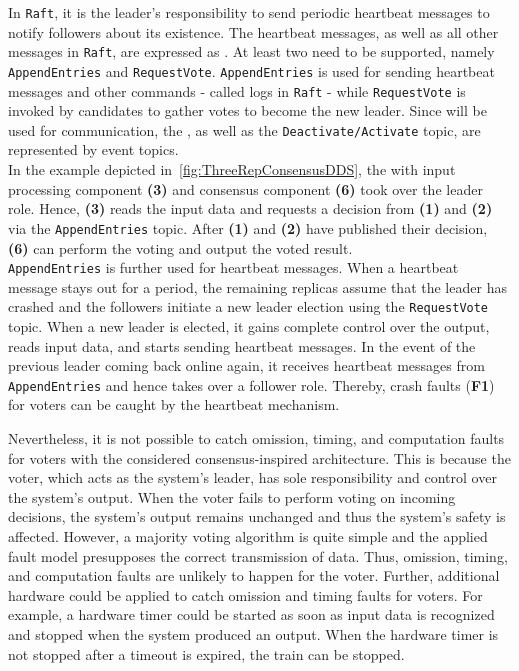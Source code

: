 \noindent
In \texttt{Raft}, it is the leader's responsibility to send periodic heartbeat messages to notify followers about its existence.
The heartbeat messages, as well as all other messages in \texttt{Raft}, are expressed as .
At least two  need to be supported, namely \texttt{AppendEntries} and \texttt{RequestVote}.
\texttt{AppendEntries} is used for sending heartbeat messages and other commands - called logs in \texttt{Raft} - while \texttt{RequestVote} is invoked by candidates to gather votes to become the new leader.
Since  will be used for communication, the , as well as the \texttt{Deactivate/Activate} topic, are represented by  event topics.
\\

\noindent
In the example depicted in~\autoref{fig:ThreeRepConsensusDDS}, the  with input processing component \textbf{(3)} and consensus component \textbf{(6)} took over the leader role.
Hence, \textbf{(3)} reads the input data and requests a decision from \textbf{(1)} and \textbf{(2)} via the \texttt{AppendEntries} topic.
After \textbf{(1)} and \textbf{(2)} have published their decision, \textbf{(6)} can perform the voting and output the voted result.
\\

\noindent
\texttt{AppendEntries} is further used for heartbeat messages.
When a heartbeat message stays out for a period, the remaining replicas assume that the leader has crashed and the followers initiate a new leader election using the \texttt{RequestVote} topic.
When a new leader is elected, it gains complete control over the output, reads input data, and starts sending heartbeat messages.
In the event of the previous leader coming back online again, it receives heartbeat messages from \texttt{AppendEntries} and hence takes over a follower role.
Thereby, crash faults (\textbf{F1}) for voters can be caught by the heartbeat mechanism.

Nevertheless, it is not possible to catch omission, timing, and computation faults for voters with the considered consensus-inspired architecture.
This is because the voter, which acts as the system's leader, has sole responsibility and control over the system's output.
When the voter fails to perform voting on incoming decisions, the system's output remains unchanged and thus the system's safety is affected.
However, a majority voting algorithm is quite simple and the applied fault model presupposes the correct transmission of data. Thus, omission, timing, and computation faults are unlikely to happen for the voter.
Further, additional hardware could be applied to catch omission and timing faults for voters.
For example, a hardware timer could be started as soon as input data is recognized and stopped when the system produced an output.
When the hardware timer is not stopped after a timeout is expired, the train can be stopped.
\\

